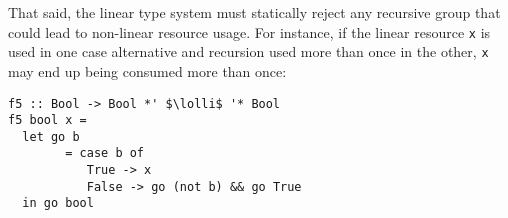 \documentclass[acmsmall,review,anonymous,screen]{acmart}
\newcommand{\incode}[1]{\lstinline{#1}}
\newcommand{\lolli}{\multimap}
\begin{document}
That said, the linear type system must statically reject any recursive group that could
lead to non-linear resource usage.
%
%
%
For instance, if the linear resource \incode{x} is used in one case alternative and
recursion used more than once in the other, \incode{x} may end up being consumed
more than once:
%
\begin{noway}
\begin{lstlisting}
f5 :: Bool -> Bool *' $\lolli$ '* Bool
f5 bool x =
  let go b
        = case b of
           True -> x
           False -> go (not b) && go True
  in go bool
\end{lstlisting}
\end{noway}
%
\end{document}
